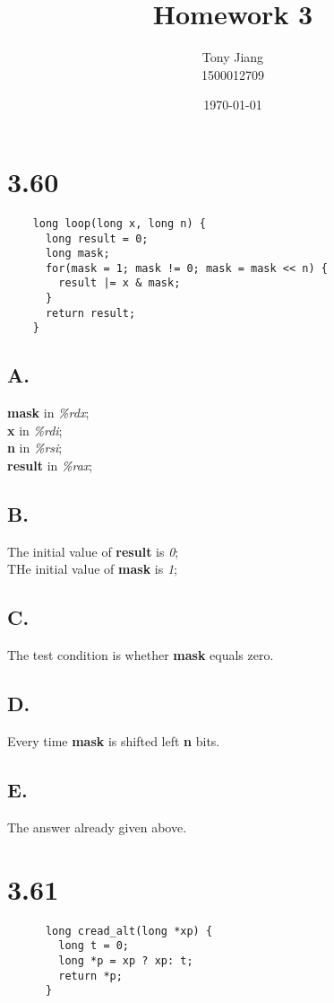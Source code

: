\documentclass[10pt a4paper]{article}
\title{Homework 3}
\author{Tony Jiang\\1500012709}
\date{\today}
\begin{document}
\maketitle
\section{\textbf{3.60}}
  \begin{lstlisting}
    long loop(long x, long n) {
      long result = 0;
      long mask;
      for(mask = 1; mask != 0; mask = mask << n) {
        result |= x & mask;
      }
      return result;
    }
  \end{lstlisting}
  \subsection{\textbf{A.}}
    \textbf{mask} in \textit{\%rdx}; \\
    \textbf{x} in \textit{\%rdi}; \\
    \textbf{n} in \textit{\%rsi}; \\
    \textbf{result} in \textit{\%rax};

  \subsection{\textbf{B.}}
    The initial value of \textbf{result} is \textit{0}; \\
    THe initial value of \textbf{mask} is \textit{1};

  \subsection{\textbf{C.}}
    The test condition is whether \textbf{mask} equals zero.

  \subsection{\textbf{D.}}
    Every time \textbf{mask} is shifted left \textbf{n} bits.

  \subsection{\textbf{E.}}
    The answer already given above.

  \section{\textbf{3.61}}
    \begin{lstlisting}
      long cread_alt(long *xp) {
        long t = 0;
        long *p = xp ? xp: t;
        return *p;
      }
    \end{lstlisting}
\end{document}
